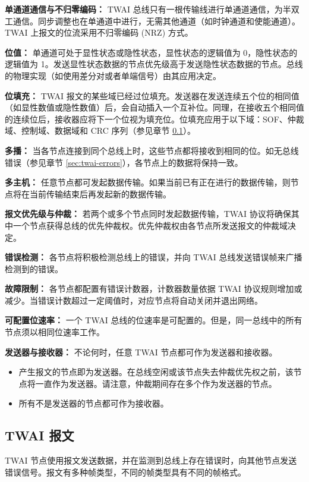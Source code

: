 \documentclass[main\_\_CN.tex]{subfiles}
\begin{document}
{\bfseries 单通道通信与不归零编码：} TWAI 总线只有一根传输线进行单通道通信，为半双工通信。同步调整也在单通道中进行，无需其他通道（如时钟通道和使能通道）。TWAI 上报文的位流采用不归零编码 (NRZ) 方式。

{\bfseries 位值：} 单通道可处于显性状态或隐性状态，显性状态的逻辑值为 0，隐性状态的逻辑值为 1。发送显性状态数据的节点优先级高于发送隐性状态数据的节点。总线的物理实现（如使用差分对或者单端信号）由其应用决定。

{\bfseries 位填充：} TWAI 报文的某些域已经过位填充。发送器在发送连续五个位的相同值（如显性数值或隐性数值）后，会自动插入一个互补位。同理，在接收五个相同值的连续位后，接收器应将下一个位视为填充位。位填充应用于以下域：SOF、仲裁域、控制域、数据域和 CRC 序列（参见章节 \ref{sec:twai-messages}）。

{\bfseries 多播：} 当各节点连接到同个总线上时，这些节点都将接收到相同的位。如无总线错误（参见章节 \ref{sec:twai-errors}），各节点上的数据将保持一致。

{\bfseries 多主机：} 任意节点都可发起数据传输。如果当前已有正在进行的数据传输，则节点将在当前传输结束后再发起新的数据传输。

{\bfseries 报文优先级与仲裁：} 若两个或多个节点同时发起数据传输，TWAI 协议将确保其中一个节点获得总线的优先仲裁权。优先仲裁权由各节点所发送报文的仲裁域决定。

{\bfseries 错误检测：} 各节点将积极检测总线上的错误，并向 TWAI 总线发送错误帧来广播检测到的错误。

{\bfseries 故障限制：} 各节点都配置有错误计数器，计数器数量依据 TWAI 协议规则增加或减少。当错误计数超过一定阈值时，对应节点将自动关闭并退出网络。

{\bfseries 可配置位速率：} 一个 TWAI 总线的位速率是可配置的。但是，同一总线中的所有节点须以相同位速率工作。

{\bfseries 发送器与接收器：} 不论何时，任意 TWAI 节点都可作为发送器和接收器。
\begin{itemize}
    \item 产生报文的节点即为发送器。在总线空闲或该节点失去仲裁优先权之前，该节点将一直作为发送器。请注意，仲裁期间存在多个作为发送器的节点。
    \item 所有不是发送器的节点都可作为接收器。
\end{itemize}

\subsection{TWAI 报文}
\label{sec:twai-messages}
TWAI 节点使用报文发送数据，并在监测到总线上存在错误时，向其他节点发送错误信号。报文有多种帧类型，不同的帧类型具有不同的帧格式。
\end{document}
